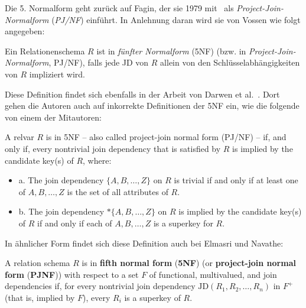 \begin{tcolorbox}[excursusbox, title={Definition der 5. Normalform in der Literatur}]
    Die {5.} Normalform geht zurück auf Fagin, der sie 1979 mit~\cite{Fag79} als \textit{Project-Join-Normalform} (\textit{PJ/NF}) einführt.
    In Anlehnung daran wird sie von Vossen wie folgt angegeben:
    \begin{displayquote}
        Ein Relationenschema $R$ ist in \textit{fünfter Normalform} (5NF) (bzw. in \textit{Project-Join-Normalform}, PJ/NF), falls jede JD von $R$ allein von den Schlüsselabhängigkeiten von $R$ impliziert wird.
        \par\hfill\cite[Definition 8.12, S. 273, Hervorhebung i.O.]{Vos08}
    \end{displayquote}

    Diese Definition findet sich ebenfalls in der Arbeit von Darwen et al.~\cite[Definition 2.3]{Dar12}.
    Dort gehen die Autoren auch auf inkorrekte Definitionen der 5NF ein, wie die folgende von einem der Mitautoren:

    \begin{displayquote}
        A relvar $R$ is in 5NF -- also called project-join normal form (PJ/NF) -- if, and only if, every nontrivial join dependency that is satisfied by $R$ is implied by the candidate key(s) of $R$, where:
        \begin{itemize}
            \item[] a. The join dependency $\{A, B, \ldots, Z\}$ on $R$ is trivial if and only if at least one of $A, B, \ldots, Z$ is the set of all attributes of $R$.
            \item[] b. The join dependency $*\{A, B, \ldots, Z\}$ on $R$ is implied by the candidate key(s) of $R$ if and only if each of $A, B, \ldots, Z$ is a superkey for $R$.
        \end{itemize}
        \par\hfill\cite[S. 389--390]{Dat03}
    \end{displayquote}

    In ähnlicher Form findet sich diese Definition auch bei Elmasri und Navathe:
    \begin{displayquote}
        A relation schema $R$ is in \textbf{fifth normal form} (\textbf{5NF}) (or \textbf{project-join normal form} (\textbf{PJNF})) with respect to a set $F$ of functional, multivalued, and join dependencies if, for every nontrivial join dependency $\text{JD}(R_1, R_2, \ldots, R_n)$ in $F^+$ (that is, implied by $F$), every $R_i$ is a superkey of $R$.
        \par\hfill~\cite[S. 494, Hervorhebung i.O.]{EN16}
    \end{displayquote}


\end{tcolorbox}
